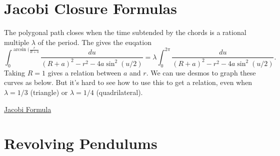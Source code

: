 \documentclass{ximera}
\begin{document}
\section{Jacobi Closure Formulas}

The polygonal path closes when the time subtended by the chords is a rational multiple $\lambda$ of the period. The gives the euqation
\[
     \int_0^{\arcsin(\frac{r}{R+a}} \frac{du}{(R+a)^2 - r^2 - 4a\sin^2(u/2)} = \lambda \int_0^{2\pi} \frac{du}{(R+a)^2 - r^2 - 4a\sin^2(u/2)} .
\]
Taking $R=1$ gives a relation between $a$ and $r$. We can use desmos to graph these curves as below. But it's hard to see how to use this to get a relation, even when $\lambda=1/3$ (triangle) or $\lambda  = 1/4$ (quadrilateral).


\begin{onlineOnly}
    \begin{center}
\end{center}
\end{onlineOnly}

\href{https://www.desmos.com/calculator/wnef0tpllt}{Jacobi Formula}



\section*{Revolving Pendulums}
\end{document}
